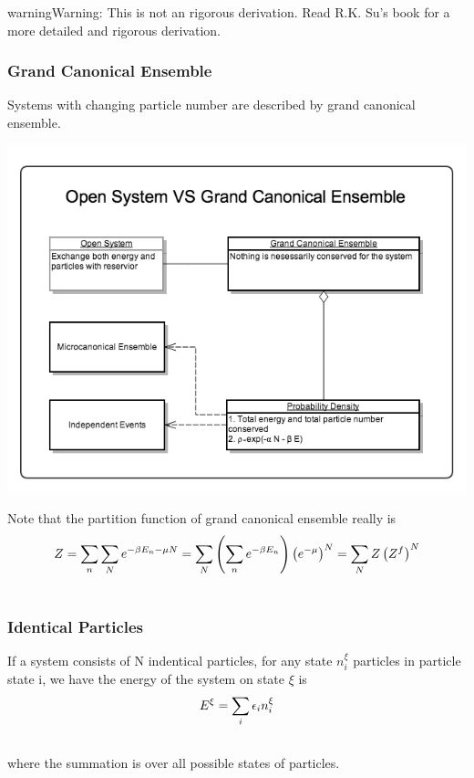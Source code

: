 \documentclass[letterpaper,10pt,english]{sphinxmanual}
\begin{document}
\begin{notice}{warning}{Warning:}
This is not an rigorous derivation. Read R.K. Su's book for a more detailed and rigorous derivation.
\end{notice}


\subsubsection{Grand Canonical Ensemble}
\label{equilibrium/week5:grand-canonical-ensemble}\label{equilibrium/week5:index-3}
Systems with changing particle number are described by grand canonical ensemble.

{\hfill\includegraphics{grandCanonical.png}\hfill}

Note that the partition function of grand canonical ensemble really is
\begin{gather}
\begin{split}Z = \sum _ n \sum_N  e^{-\beta E_n - \mu N} = \sum_N \left( \sum _ n e^{- \beta E _ n}  \right)\left(e^{-\mu}\right)^N = \sum _ N Z \left(Z^f\right)^N\end{split}\notag\\\begin{split}\end{split}\notag
\end{gather}

\subsubsection{Identical Particles}
\label{equilibrium/week5:index-4}\label{equilibrium/week5:identical-particles}
If a system consists of N indentical particles, for any state $n_i^\xi$ particles in particle state i, we have the energy of the system on state $\xi$ is
\begin{gather}
\begin{split}E^\xi = \sum_i \epsilon_i n_i^\xi\end{split}\notag\\\begin{split}\end{split}\notag
\end{gather}
where the summation is over all possible states of particles.
\end{document}

